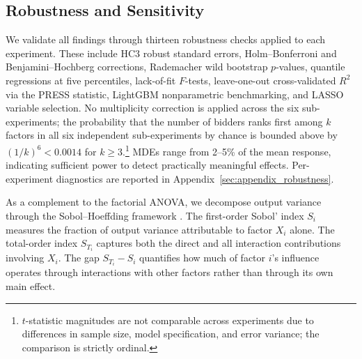 \subsection{Robustness and Sensitivity}

We validate all findings through thirteen robustness checks applied to each experiment. These include HC3 robust standard errors, Holm--Bonferroni and Benjamini--Hochberg corrections, Rademacher wild bootstrap $p$-values, quantile regressions at five percentiles, lack-of-fit $F$-tests, leave-one-out cross-validated $R^2$ via the PRESS statistic, LightGBM nonparametric benchmarking, and LASSO variable selection. No multiplicity correction is applied across the six sub-experiments; the probability that the number of bidders ranks first among $k$ factors in all six independent sub-experiments by chance is bounded above by $(1/k)^6 < 0.0014$ for $k \geq 3$.\footnote{$t$-statistic magnitudes are not comparable across experiments due to differences in sample size, model specification, and error variance; the comparison is strictly ordinal.} MDEs range from 2--5\% of the mean response, indicating sufficient power to detect practically meaningful effects. Per-experiment diagnostics are reported in Appendix~\ref{sec:appendix_robustness}.

\label{sec:appendix_sensitivity}

As a complement to the factorial ANOVA, we decompose output variance through the Sobol--Hoeffding framework \citep{Sobol2001}. The first-order Sobol' index $S_i$ measures the fraction of output variance attributable to factor $X_i$ alone. The total-order index $S_{T_i}$ captures both the direct and all interaction contributions involving $X_i$. The gap $S_{T_i} - S_i$ quantifies how much of factor $i$'s influence operates through interactions with other factors rather than through its own main effect.


